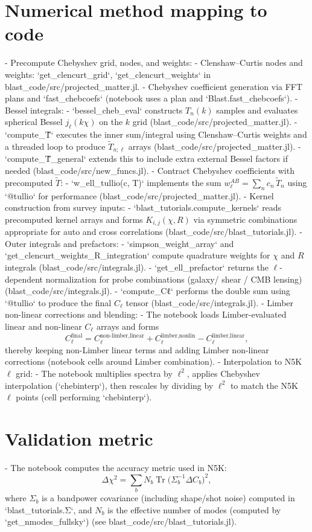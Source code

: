 \documentclass{article}
\begin{document}
\section*{Numerical method mapping to code}
- Precompute Chebyshev grid, nodes, and weights:
  - Clenshaw–Curtis nodes and weights: `get_clencurt_grid`, `get_clencurt_weights` in blast_code/src/projected_matter.jl.
  - Chebyshev coefficient generation via FFT plans and `fast_chebcoefs` (notebook uses a plan and `Blast.fast_chebcoefs`).
- Bessel integrals:
  - `bessel_cheb_eval` constructs $T_n(k)$ samples and evaluates spherical Bessel $j_\ell(k\chi)$ on the $k$ grid (blast_code/src/projected_matter.jl).
  - `compute_T̃` executes the inner sum/integral using Clenshaw–Curtis weights and a threaded loop to produce $\tilde T_{n;\ell}$ arrays (blast_code/src/projected_matter.jl).
  - `compute_T̃_general` extends this to include extra external Bessel factors if needed (blast_code/src/new_funcs.jl).
- Contract Chebyshev coefficients with precomputed $\tilde T$:
  - `w_ell_tullio(c, T)` implements the sum $w_\ell^{AB}=\sum_n c_n\,\tilde T_n$ using `@tullio` for performance (blast_code/src/projected_matter.jl).
- Kernel construction from survey inputs:
  - `blast_tutorials.compute_kernels` reads precomputed kernel arrays and forms $K_{i,j}(\chi,R)$ via symmetric combinations appropriate for auto and cross correlations (blast_code/src/blast_tutorials.jl).
- Outer integrals and prefactors:
  - `simpson_weight_array` and `get_clencurt_weights_R_integration` compute quadrature weights for $\chi$ and $R$ integrals (blast_code/src/integrals.jl).
  - `get_ell_prefactor` returns the $\ell$-dependent normalization for probe combinations (galaxy/ shear / CMB lensing) (blast_code/src/integrals.jl).
  - `compute_Cℓ` performs the double sum using `@tullio` to produce the final $C_\ell$ tensor (blast_code/src/integrals.jl).
- Limber non-linear corrections and blending:
  - The notebook loads Limber-evaluated linear and non-linear $C_\ell$ arrays and forms
  $$
  C_\ell^{\text{final}} = C_\ell^{\text{non-limber,linear}} + C_\ell^{\text{limber,nonlin}} - C_\ell^{\text{limber,linear}},
  $$
  thereby keeping non-Limber linear terms and adding Limber non-linear corrections (notebook cells around Limber combination).
- Interpolation to N5K $\ell$ grid:
  - The notebook multiplies spectra by $\ell^2$, applies Chebyshev interpolation (`chebinterp`), then rescales by dividing by $\ell^2$ to match the N5K $\ell$ points (cell performing `chebinterp`).

\section*{Validation metric}
- The notebook computes the accuracy metric used in N5K:
$$
\Delta\chi^2=\sum_b N_b \operatorname{Tr}\big(\Sigma_b^{-1}\Delta C_b\big)^2,
$$
where $\Sigma_b$ is a bandpower covariance (including shape/shot noise) computed in `blast_tutorials.Σ`, and $N_b$ is the effective number of modes (computed by `get_nmodes_fullsky`) (see blast_code/src/blast_tutorials.jl).
\end{document}
